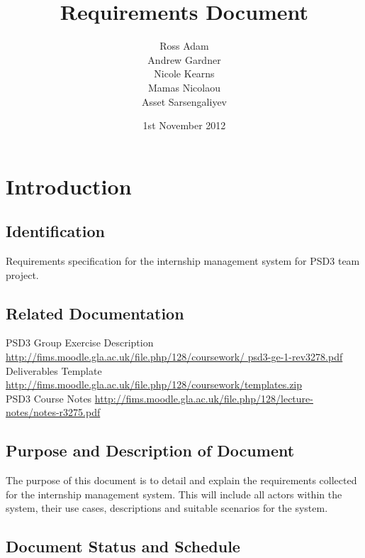 \documentclass{l3deliverable}
\title{Requirements Document}
\author{Ross Adam\\
Andrew Gardner\\
Nicole Kearns\\
Mamas Nicolaou\\
Asset Sarsengaliyev\\
}
\date{1st November 2012}
\begin{document}
\maketitle
\tableofcontents
\newpage
\section{Introduction}

\subsection{Identification}

Requirements specification for the internship management system for PSD3 team project.
\subsection{Related Documentation}

PSD3 Group Exercise Description \url{http://fims.moodle.gla.ac.uk/file.php/128/coursework/
psd3-ge-1-rev3278.pdf}\\
Deliverables Template \url{http://fims.moodle.gla.ac.uk/file.php/128/coursework/templates.zip}\\
PSD3 Course Notes \url{http://fims.moodle.gla.ac.uk/file.php/128/lecture-notes/notes-r3275.pdf}
\\
\subsection{Purpose and Description of Document}

The purpose of this document is to detail and explain the requirements collected for the
internship management system. This will include all actors within the system, their use cases, descriptions and suitable 
scenarios for the system.

\subsection{Document Status and Schedule}
\end{document}

